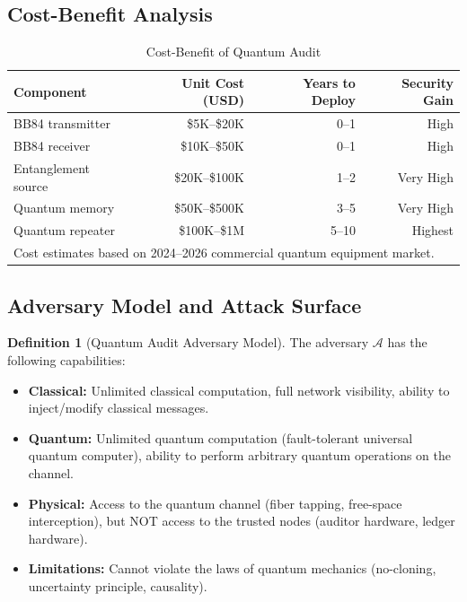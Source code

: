 \documentclass[11pt,a4paper]{article}
\theoremstyle{plain}
\theoremstyle{definition}
\newtheorem{definition}[theorem]{Definition}
\theoremstyle{remark}
\newcommand{\cA}{\mathcal{A}}
\begin{document}
\subsection{Cost-Benefit Analysis}
\label{sec:cost_benefit}

\begin{table}[H]
\centering
\caption{Cost-Benefit of Quantum Audit}
\label{tab:cost}
\begin{tabular}{@{}lrrr@{}}
\toprule
\textbf{Component} & \textbf{Unit Cost (USD)} & \textbf{Years to Deploy} & \textbf{Security Gain} \\
\midrule
BB84 transmitter & \$5K--\$20K & 0--1 & High \\
BB84 receiver & \$10K--\$50K & 0--1 & High \\
Entanglement source & \$20K--\$100K & 1--2 & Very High \\
Quantum memory & \$50K--\$500K & 3--5 & Very High \\
Quantum repeater & \$100K--\$1M & 5--10 & Highest \\
\midrule
\multicolumn{4}{l}{\footnotesize Cost estimates based on 2024--2026 commercial quantum equipment market.} \\
\bottomrule
\end{tabular}
\end{table}

\subsection{Adversary Model and Attack Surface}
\label{sec:adversary}

\begin{definition}[Quantum Audit Adversary Model]
\label{def:adversary_model}
The adversary $\cA$ has the following capabilities:
\begin{itemize}
  \item \textbf{Classical:} Unlimited classical computation, full network
        visibility, ability to inject/modify classical messages.
  \item \textbf{Quantum:} Unlimited quantum computation (fault-tolerant
        universal quantum computer), ability to perform arbitrary quantum
        operations on the channel.
  \item \textbf{Physical:} Access to the quantum channel (fiber tapping,
        free-space interception), but NOT access to the trusted nodes
        (auditor hardware, ledger hardware).
  \item \textbf{Limitations:} Cannot violate the laws of quantum mechanics
        (no-cloning, uncertainty principle, causality).
\end{itemize}
\end{definition}
\end{document}
